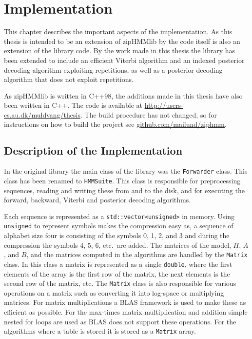 
\chapter{Implementation}
\label{cha:implementation}

This chapter describes the important aspects of the implementation. As this
thesis is intended to be an extension of zipHMMlib by \citet{sand2013ziphmmlib}
the code itself is also an extension of the library code. By the work made in
this thesis the library has been extended to include an efficient Viterbi
algorithm and an indexed posterior decoding algorithm exploiting
repetitions, as well as a posterior decoding algorithm that does not
exploit repetitions.

As zipHMMlib is written in C++98, the additions made in this thesis have also
been written in C++. The code is available at
\url{http://users-cs.au.dk/muldvang/thesis}. The build procedure has not
changed, so for instructions on how to build the project see
\url{github.com/mailund/ziphmm}.

\section{Description of the Implementation}
\label{sec:descr-impl}

In the original library the main class of the library was the
\texttt{Forwarder} class.  This class has been renamed to \texttt{HMMSuite}.
This class is responsible for preprocessing sequences, reading and writing
these from and to the disk, and for executing the forward, backward, Viterbi
and posterior decoding algorithms.

Each sequence is represented as a \texttt{std::vector<unsigned>} in memory.
Using \texttt{unsigned} to represent symbols makes the compression easy as, a
sequence of alphabet size four is consisting of the symbols 0, 1, 2, and 3 and
during the compression the symbols 4, 5, 6, etc.\ are added. The matrices of
the model, $\Pi$, $A$, and $B$, and the matrices computed in the algorithms are
handled by the \texttt{Matrix} class. In this class a matrix is represented as
a single \texttt{double}, where the first elements of the array is the first
row of the matrix, the next elements is the second row of the matrix, etc. The
\texttt{Matrix} class is also responsible for various operations on a matrix
such as converting it into log-space or multiplying matrices. For matrix
multiplications a BLAS framework is used to make these as efficient as
possible. For the max-times matrix multiplication and addition simple nested
for loops are used as BLAS does not support these operations. For the
algorithms where a table is stored it is stored as a \texttt{Matrix} array.

